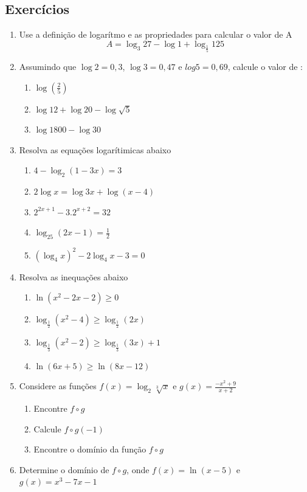 \subsection{Exercícios }
\begin{enumerate}
\item Use a definição de logarítmo e as propriedades para calcular o valor de A
$$A= \log_3{27}-\log1+ \log_{\frac{1}{5}}{125}$$
\item Assumindo que $\log2=0,3$, $\log3=0,47$ e $log5=0,69$, calcule o valor de :
\begin{enumerate}
    \item $\log(\frac{2}{5})$
    \item $\log12+\log20-\log\sqrt{5}$
    \item $\log1800-\log30$
\end{enumerate}
\item Resolva as equações logarítimicas abaixo

\begin{enumerate}
	\item $4-\log_2{(1-3x)}=3$
	\item $2\log{x}=\log{3x}+\log{(x-4)}$
	\item $2^{2x + 1} - 3.2^{x + 2} = 32$
	 \item $\log_{25} (2x-1)=\frac{1}{2}$
          \item $(\log_4x)^2-2 \log_4x-3=0$
\end{enumerate}
\vspace{0,2cm}

\item Resolva as inequações abaixo
\begin{enumerate}
	\item $\ln(x^2-2x-2)\geq 0$
	 \item  $\log_{\frac{1}{2}}(x^2-4) \geq \log_{\frac{1}{2}}(2x)$
	 \item $\log_{\frac{1}{3}}(x^2-2) \geq \log_{\frac{1}{3}}(3x)+1$
        \item $\ln(6x+5) \geq \ln(8x-12)$
\end{enumerate}

\vspace{0,2cm}

\item Considere as funções $f(x)=\log_{2}\sqrt[3]{x} $ e  $g(x)=\frac{-x^2+9}{x+2}$

\begin{enumerate}
	\item Encontre $f\circ g$
	\item Calcule $f\circ g (-1)$
	\item Encontre o domínio da função $f\circ g$
\end{enumerate}
\vspace{0,2cm}
\item Determine o domínio de $f\circ g$, onde $f(x)=\ln(x-5)$ e $g(x)=x^3-7x-1$
\vspace{0,2cm}


\end{enumerate}
